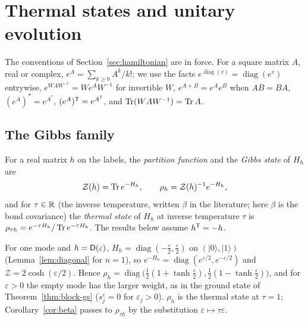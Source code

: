 \section{Thermal states and unitary evolution}
\label{sec:thermal}

The conventions of Section~\ref{sec:hamiltonian} are in force. For a square matrix $A$, real
or complex, $e^A=\sum_{k\geq0}A^k/k!$; we use the facts $e^{\operatorname{diag}(v)}
=\operatorname{diag}(e^{v})$ entrywise, $e^{WAW^{-1}}=We^AW^{-1}$ for invertible $W$,
$e^{A+B}=e^Ae^B$ when $AB=BA$, $(e^A)^*=e^{A^*}$, $(e^A)^{\mathsf T}=e^{A^{\mathsf T}}$, and
$\operatorname{Tr}(WAW^{-1})=\operatorname{Tr} A$.

\subsection{The Gibbs family}
\label{sec:exponential-family}

\begin{definition}\label{def:thermal}
For a real matrix $h$ on the labels, the \emph{partition function} and the \emph{Gibbs
state} of $H_h$ are
\[
 \mathcal Z(h)=\operatorname{Tr} e^{-H_h},\qquad \rho_h=\mathcal Z(h)^{-1}e^{-H_h},
\]
and for $\tau\in\mathbb R$ (the inverse temperature, written $\beta$ in the literature; here
$\beta$ is the bond covariance) the \emph{thermal state} of $H_h$ at inverse temperature
$\tau$ is $\rho_{\tau h}=e^{-\tau H_h}/\operatorname{Tr} e^{-\tau H_h}$. The results below assume $h^{\mathsf T}=-h$.
\end{definition}
For one mode and $h=\mathsf D(\varepsilon)$, $H_h=\operatorname{diag}(-\tfrac\varepsilon2,\tfrac\varepsilon2)$
on $(|0\rangle,|1\rangle)$ (Lemma~\ref{lem:diagonal} for $n=1$), so
$e^{-H_h}=\operatorname{diag}(e^{\varepsilon/2},e^{-\varepsilon/2})$ and $\mathcal Z=2\cosh(\varepsilon/2)$.
Hence $\rho_h=\operatorname{diag}\bigl(\tfrac12(1+\tanh\tfrac\varepsilon2),\tfrac12(1-\tanh\tfrac\varepsilon2)\bigr)$,
and for $\varepsilon>0$ the empty mode has the larger weight, as in the ground state of
Theorem~\ref{thm:block-gs} ($s^\varepsilon_j=0$ for $\varepsilon_j>0$). $\rho_h$ is the thermal state at $\tau=1$; Corollary~\ref{cor:beta} passes to
$\rho_{\tau h}$ by the substitution $\varepsilon\mapsto\tau\varepsilon$.

